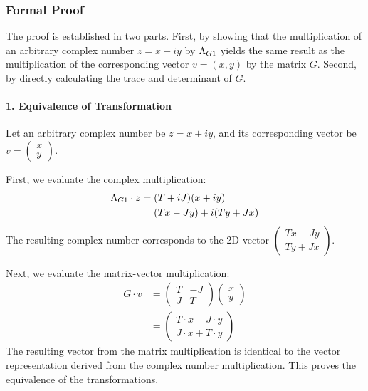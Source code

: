 \subsubsection*{Formal Proof}
The proof is established in two parts. First, by showing that the multiplication of an arbitrary complex number $z = x+iy$ by $\Lambda_{G1}$ yields the same result as the multiplication of the corresponding vector $v = (x, y)$ by the matrix $G$. Second, by directly calculating the trace and determinant of $G$.

\paragraph{1. Equivalence of Transformation}
Let an arbitrary complex number be $z = x+iy$, and its corresponding vector be $v = \begin{pmatrix} x \\ y \end{pmatrix}$.

First, we evaluate the complex multiplication:
\begin{align*}
    \Lambda_{G1} \cdot z &= (T + iJ)(x + iy) \\
    &= (Tx - Jy) + i(Ty + Jx)
\end{align*}
The resulting complex number corresponds to the 2D vector $\begin{pmatrix} Tx - Jy \\ Ty + Jx \end{pmatrix}$.

Next, we evaluate the matrix-vector multiplication:
\begin{align*}
    G \cdot v &= \begin{pmatrix} T & -J \\ J & T \end{pmatrix} \begin{pmatrix} x \\ y \end{pmatrix} \\
    &= \begin{pmatrix} T \cdot x - J \cdot y \\ J \cdot x + T \cdot y \end{pmatrix}
\end{align*}
The resulting vector from the matrix multiplication is identical to the vector representation derived from the complex number multiplication. This proves the equivalence of the transformations.

